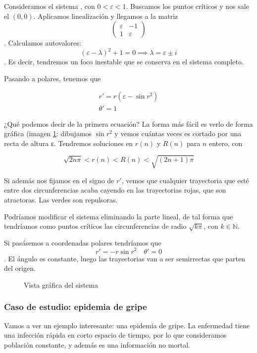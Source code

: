 \begin{example}
Consideramos el sistema , con $0 < ε < 1$. Buscamos los puntos críticos y nos sale el $(0,0)$. Aplicamos linealización y llegamos a la matriz \[ \begin{pmatrix}
ε & -1 \\ 1 & ε
\end{pmatrix} \]. Calculamos autovalores: \[ (ε-λ)^2 + 1 = 0 \implies λ = ε\pm i \]. Es decir, tendremos un foco inestable que se conserva en el sistema completo.

Pasando a polares, tenemos que

\begin{gather*}
r' = r(ε-\sin r^2) \\
θ' = 1
\end{gather*}


¿Qué podemos decir de la primera ecuación? La forma más fácil es verlo de forma gráfica (imagen \ref{img8-Ej7}: dibujamos $\sin r^2$ y vemos cuántas veces es cortado por una recta de altura ε. Tendremos soluciones en $r(n)$ y $R(n)$ para $n$ entero, con

\[ \sqrt{2nπ} < r(n) < R(n) < \sqrt{(2n+1)π} \]

Si además nos fijamos en el signo de $r'$, vemos que cualquier trayectoria que esté entre dos circunferencias acaba cayendo en las trayectorias rojas, que son atractoras. Las verdes son repulsoras.

Podríamos modificar el sistema eliminando la parte lineal, de tal forma que tendríamos como puntos críticos las circunferencias de radio $\sqrt{kπ}$, con $k∈ℕ$.

Si pasásemos a coordenadas polares tendríamos que \[ r'=-r\sin r^2\quad θ'=0 \]. El ángulo es constante, luego las trayectorias van a ser semirrectas que parten del origen.

\end{example}

\begin{figure}[hbtp]
\centering
{}
\label{img8-Ej7}
\caption{Vista gráfica del sistema}
\end{figure}

\subsubsection{Caso de estudio: epidemia de gripe}

Vamos a ver un ejemplo interesante: una epidemia de gripe. La enfermedad tiene una infección rápida en corto espacio de tiempo, por lo que consideramos población constante, y además es una información no mortal.


